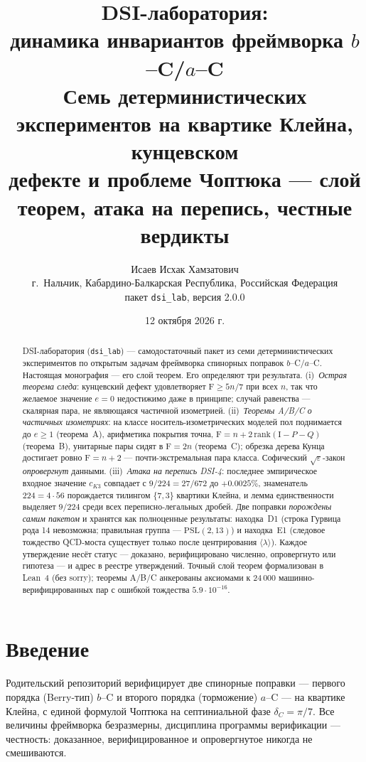 \documentclass[11pt,a4paper]{article}
\title{\bf DSI-лаборатория:\\ динамика инвариантов фреймворка $b$--C/$a$--C\\
\large Семь детерминистических экспериментов на квартике Клейна, кунцевском\\ дефекте и проблеме Чоптюка --- слой теорем, атака на перепись, честные вердикты}
\author{Исаев Исхак Хамзатович\\ \small г.~Нальчик, Кабардино-Балкарская Республика, Российская Федерация\\[-2pt]
\small пакет \texttt{dsi\_lab}, версия 2.0.0}
\date{12 октября 2026 г.}
\theoremstyle{definition}
\newcommand{\F}{\mathrm{F}}
\begin{document}
\maketitle

\begin{abstract}
\noindent
DSI-лаборатория (\texttt{dsi\_lab}) --- самодостаточный пакет из семи
детерминистических экспериментов по открытым задачам фреймворка
спинорных поправок $b$--C/$a$--C. Настоящая монография --- его слой
теорем. Его определяют три результата. (i)~\emph{Острая теорема
следа}: кунцевский дефект удовлетворяет $\F \ge 5n/7$ при всех $n$,
так что желаемое значение $e = 0$ недостижимо даже в принципе; случай
равенства --- скалярная пара, не являющаяся частичной изометрией.
(ii)~\emph{Теоремы A/B/C о частичных изометриях}: на классе
носитель-изометрических моделей пол поднимается до $e \ge 1$
(теорема~A), арифметика покрытия точна,
$\F = n + 2\,\mathrm{rank}(\mathrm{I}-P-Q)$ (теорема~B), унитарные пары
сидят в $\F = 2n$ (теорема~C); обрезка дерева Кунца достигает ровно
$\F = n+2$ --- почти-экстремальная пара класса. Софический
$\sqrt{\varepsilon}$-закон \emph{опровергнут} данными.
(iii)~\emph{Атака на перепись DSI-4}: последнее эмпирическое входное
значение $c_{K3}$ совпадает с $9/224 = 27/672$ до $+0.0025\%$,
знаменатель $224 = 4\cdot 56$ порождается тилингом $\{7,3\}$ квартики
Клейна, и лемма единственности выделяет $9/224$ среди всех
переписно-легальных дробей. Две поправки \emph{порождены самим
пакетом} и хранятся как полноценные результаты: находка~D1 (строка
Гурвица рода 14 невозможна; правильная группа --- $\mathrm{PSL}(2,13)$)
и находка~E1 (следовое тождество QCD-моста существует только после
центрирования $\langle\lambda\rangle$). Каждое утверждение несёт
статус --- доказано, верифицировано численно, опровергнуто или
гипотеза --- и адрес в реестре утверждений. Точный слой теорем
формализован в Lean~4 (без sorry); теоремы A/B/C анкерованы аксиомами
к 24\,000 машинно-верифицированных пар с ошибкой тождества
$5.9\cdot 10^{-16}$.
\end{abstract}

\tableofcontents

\section{Введение}\label{sec:intro}

Родительский репозиторий верифицирует две спинорные поправки ---
первого порядка (Berry-тип) $b$--C и второго порядка (торможение)
$a$--C --- на квартике Клейна, с единой формулой Чоптюка на
септиниальной фазе $\delta_C = \pi/7$. Все величины фреймворка
безразмерны, дисциплина программы верификации --- честность:
доказанное, верифицированное и опровергнутое никогда не смешиваются.
\end{document}
